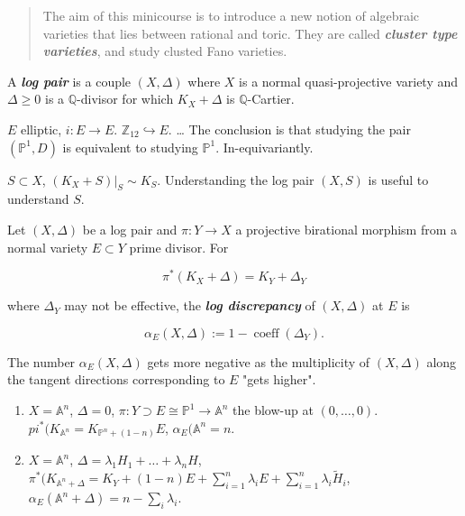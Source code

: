 \begin{quotation}
The aim of this minicourse is to introduce a
new notion of algebraic varieties that lies
between rational and toric. They are called
\textit{\textbf{cluster type varieties}}, and
study clusted Fano varieties.
\end{quotation}

\medskip{}

\begin{definition}
\label{definition-moraga-5}
A \textit{\textbf{log pair}} is a couple
$(X,\Delta)$ where $X$ is a normal
quasi-projective variety and $\Delta \geq 0$
is a $\mathbb{Q}$-divisor for which
$K_{X}+\Delta$ is $\mathbb{Q}$-Cartier.
\end{definition}

\begin{example}
\label{example-moraga-2}
$E$ elliptic, $i:E\to E$.
$\mathbb{Z}_{12}\hookrightarrow E$.
{\ldots{}} The conclusion is that studying
the pair $(\mathbb{P}^{1},D)$ is equivalent
to studying $\mathbb{P}^{1}$.
In-equivariantly.
\end{example}

\begin{example}
\label{example-moraga-3}
$S\subset X$, $(K_{X}+S)|_{S}\sim K_{S}$.
Understanding the log pair $(X,S)$ is useful
to understand $S$.
\end{example}

\begin{definition}
\label{definition-moraga-6}
Let $(X,\Delta )$ be a log pair and $\pi:Y\to
X$ a projective birational morphism from a
normal variety $E\subset Y$ prime divisor.
For

$$
\pi^{*}(K_{X}+\Delta )=K_{Y}+\Delta_{Y}
$$

where $\Delta_{Y}$ may not be effective, the
\textit{\textbf{log discrepancy}} of
$(X,\Delta )$ at $E$ is

$$
\alpha_{E}(X,\Delta
):=1-\operatorname{coeff}(\Delta_{Y}).
$$

\end{definition}

\begin{remark}
\label{remark-moraga-2}
The number $\alpha_{E}(X,\Delta )$ gets more
negative as the multiplicity of $(X,\Delta )$
along the tangent directions corresponding to
$E$ "gets higher".
\end{remark}

\begin{example}
\label{example-moraga-4}
\begin{enumerate}
\item $X=\mathbb{A}^{n}$, $\Delta =0$,
$\pi:Y\supset E\cong \mathbb{P}^{1}\to
\mathbb{A}^{n}$ the blow-up at
$(0,\ldots,0)$.
$pi^{*}(K_{\mathbb{A}^{n}}=K_{\mathbb{P}^{n}
+(1-n)}E$, $\alpha_{E}(\mathbb{A}^{n} =n$.
\item $ X=\mathbb{A}^{n}$, $\Delta
=\lambda_{1}H_{1}+\ldots+\lambda_{n}H$,
$\pi^{*}(K_{\mathbb{A}^{n}
+\Delta}=K_{Y}+(1-n)E+\sum_{i=1}^{n}
\lambda_{i}E+\sum_{i=1}^{n}
\lambda_{i}\tilde{H}_{i}$,
$\alpha_{E}(\mathbb{A}^{n} +\Delta
)=n-\sum_{i}\lambda_{i}$.
\end{enumerate}
\end{example}

